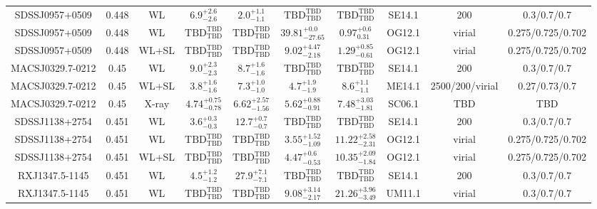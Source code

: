 \begin{table}
\begin{tabular}{cccccccccc}
SDSSJ0957+0509 & 0.448 & WL & ${6.9}^{+2.6}_{-2.6}$ & ${2.0}^{+1.1}_{-1.1}$ & ${\mathrm{TBD}}^{\mathrm{TBD}}_{\mathrm{TBD}}$ & ${\mathrm{TBD}}^{\mathrm{TBD}}_{\mathrm{TBD}}$ & SE14.1 & 200 & 0.3/0.7/0.7 \\
SDSSJ0957+0509 & 0.448 & WL & ${\mathrm{TBD}}^{\mathrm{TBD}}_{\mathrm{TBD}}$ & ${\mathrm{TBD}}^{\mathrm{TBD}}_{\mathrm{TBD}}$ & ${39.81}^{+0.0}_{-27.65}$ & ${0.97}^{+0.6}_{0.31}$ & OG12.1 & virial & 0.275/0.725/0.702 \\
SDSSJ0957+0509 & 0.448 & WL+SL & ${\mathrm{TBD}}^{\mathrm{TBD}}_{\mathrm{TBD}}$ & ${\mathrm{TBD}}^{\mathrm{TBD}}_{\mathrm{TBD}}$ & ${9.02}^{+4.47}_{-2.18}$ & ${1.29}^{+0.85}_{-0.61}$ & OG12.1 & virial & 0.275/0.725/0.702 \\
MACSJ0329.7-0212 & 0.45 & WL & ${9.0}^{+2.3}_{-2.3}$ & ${8.7}^{+1.6}_{-1.6}$ & ${\mathrm{TBD}}^{\mathrm{TBD}}_{\mathrm{TBD}}$ & ${\mathrm{TBD}}^{\mathrm{TBD}}_{\mathrm{TBD}}$ & SE14.1 & 200 & 0.3/0.7/0.7 \\
MACSJ0329.7-0212 & 0.45 & WL+SL & ${3.8}^{+1.6}_{-1.6}$ & ${7.3}^{+1.0}_{-1.0}$ & ${4.7}^{+1.9}_{-1.9}$ & ${8.6}^{+1.1}_{-1.1}$ & ME14.1 & 2500/200/virial & 0.27/0.73/0.7 \\
MACSJ0329.7-0212 & 0.45 & X-ray & ${4.74}^{+0.75}_{-0.78}$ & ${6.62}^{+2.57}_{-1.56}$ & ${5.62}^{+0.88}_{-0.91}$ & ${7.48}^{+3.03}_{-1.81}$ & SC06.1 & TBD & TBD \\
SDSSJ1138+2754 & 0.451 & WL & ${3.6}^{+0.3}_{-0.3}$ & ${12.7}^{+0.7}_{-0.7}$ & ${\mathrm{TBD}}^{\mathrm{TBD}}_{\mathrm{TBD}}$ & ${\mathrm{TBD}}^{\mathrm{TBD}}_{\mathrm{TBD}}$ & SE14.1 & 200 & 0.3/0.7/0.7 \\
SDSSJ1138+2754 & 0.451 & WL & ${\mathrm{TBD}}^{\mathrm{TBD}}_{\mathrm{TBD}}$ & ${\mathrm{TBD}}^{\mathrm{TBD}}_{\mathrm{TBD}}$ & ${3.55}^{+1.52}_{-1.09}$ & ${11.22}^{+2.58}_{-2.31}$ & OG12.1 & virial & 0.275/0.725/0.702 \\
SDSSJ1138+2754 & 0.451 & WL+SL & ${\mathrm{TBD}}^{\mathrm{TBD}}_{\mathrm{TBD}}$ & ${\mathrm{TBD}}^{\mathrm{TBD}}_{\mathrm{TBD}}$ & ${4.47}^{+0.6}_{-0.53}$ & ${10.35}^{+2.09}_{-1.84}$ & OG12.1 & virial & 0.275/0.725/0.702 \\
RXJ1347.5-1145 & 0.451 & WL & ${4.5}^{+1.2}_{-1.2}$ & ${27.9}^{+7.1}_{-7.1}$ & ${\mathrm{TBD}}^{\mathrm{TBD}}_{\mathrm{TBD}}$ & ${\mathrm{TBD}}^{\mathrm{TBD}}_{\mathrm{TBD}}$ & SE14.1 & 200 & 0.3/0.7/0.7 \\
RXJ1347.5-1145 & 0.451 & WL & ${\mathrm{TBD}}^{\mathrm{TBD}}_{\mathrm{TBD}}$ & ${\mathrm{TBD}}^{\mathrm{TBD}}_{\mathrm{TBD}}$ & ${9.08}^{+3.14}_{-2.17}$ & ${21.26}^{+3.96}_{-3.49}$ & UM11.1 & virial & 0.3/0.7/0.7 \\

\end{tabular}
\end{table}
